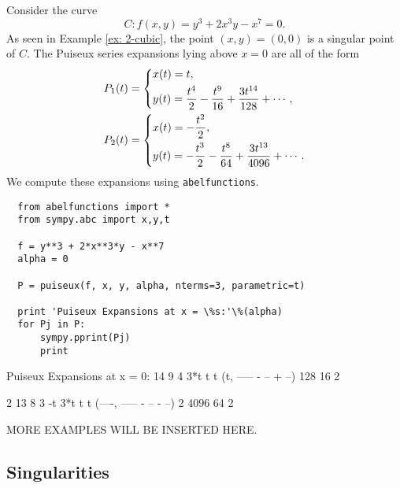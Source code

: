 \begin{example} \label{ex: 3-puiseux}
  Consider the curve
  \[
      C : f(x,y) = y^3 + 2x^3y - x^7 = 0.
  \]
  As seen in Example \ref{ex: 2-cubic}, the point $(x,y) = (0,0)$ is a
  singular point of $C$. The Puiseux series expansions lying above $x=0$
  are all of the form
  \begin{align*}
    P_1(t) &=
    \begin{dcases}
      x(t) = t, \\
      y(t) = \frac{t^{4}}{2} - \frac{t^{9}}{16} + \frac{3 t^{14}}{128} + \cdots,
    \end{dcases} \\
    P_2(t) &=
    \begin{dcases}
      x(t) = - \frac{t^{2}}{2}, \\
      y(t) =  - \frac{t^{3}}{2} - \frac{t^{8}}{64} + \frac{3 t^{13}}{4096} + \cdots.
    \end{dcases}
  \end{align*}
  We compute these expansions using {\tt abelfunctions}.

  \begin{lstlisting}
  from abelfunctions import *
  from sympy.abc import x,y,t

  f = y**3 + 2*x**3*y - x**7
  alpha = 0

  P = puiseux(f, x, y, alpha, nterms=3, parametric=t)

  print 'Puiseux Expansions at x = \%s:'\%(alpha)
  for Pj in P:
      sympy.pprint(Pj)
      print
  \end{lstlisting}
  \begin{pyoutput}
  Puiseux Expansions at x = 0:
         14    9    4 
      3*t     t    t  
  (t, ----- - -- + --)
       128    16   2  

     2      13    8    3 
   -t    3*t     t    t  
  (----, ----- - -- - --)
    2     4096   64   2  
  \end{pyoutput}
\end{example}

\vspace{24pt}

MORE EXAMPLES WILL BE INSERTED HERE.

\vspace{24pt}


\subsection{Singularities}

